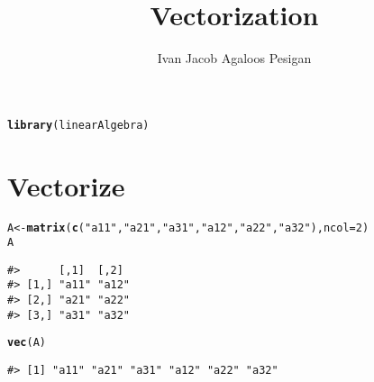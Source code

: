 \documentclass{article}\usepackage[]{graphicx}\usepackage[]{color}
\title{Vectorization}
\author{Ivan Jacob Agaloos Pesigan}
\date{}
\makeatletter
\newcommand{\hlnum}[1]{\textcolor[rgb]{0.686,0.059,0.569}{#1}}%
\newcommand{\hlstr}[1]{\textcolor[rgb]{0.192,0.494,0.8}{#1}}%
\newcommand{\hlstd}[1]{\textcolor[rgb]{0.345,0.345,0.345}{#1}}%
\newcommand{\hlkwb}[1]{\textcolor[rgb]{0.69,0.353,0.396}{#1}}%
\newcommand{\hlkwc}[1]{\textcolor[rgb]{0.333,0.667,0.333}{#1}}%
\newcommand{\hlkwd}[1]{\textcolor[rgb]{0.737,0.353,0.396}{\textbf{#1}}}%
\newenvironment{kframe}{%
 \def\at@end@of@kframe{}%
 \ifinner\ifhmode%
  \def\at@end@of@kframe{\end{minipage}}%
  \begin{minipage}{\columnwidth}%
 \fi\fi%
 \def\FrameCommand##1{\hskip\@totalleftmargin \hskip-\fboxsep
 \colorbox{shadecolor}{##1}\hskip-\fboxsep
     \hskip-\linewidth \hskip-\@totalleftmargin \hskip\columnwidth}%
 \MakeFramed {\advance\hsize-\width
   \@totalleftmargin\z@ \linewidth\hsize
   \@setminipage}}%
 {\par\unskip\endMakeFramed%
 \at@end@of@kframe}
\newenvironment{knitrout}{}{} %
\makeatother
\begin{document}
\maketitle





\begin{knitrout}
\color{fgcolor}\begin{kframe}
\begin{alltt}
\hlkwd{library}\hlstd{(linearAlgebra)}
\end{alltt}
\end{kframe}
\end{knitrout}

\section*{Vectorize}





\begin{knitrout}
\color{fgcolor}\begin{kframe}
\begin{alltt}
\hlstd{A} \hlkwb{<-} \hlkwd{matrix}\hlstd{(}\hlkwd{c}\hlstd{(}\hlstr{"a11"}\hlstd{,} \hlstr{"a21"}\hlstd{,} \hlstr{"a31"}\hlstd{,} \hlstr{"a12"}\hlstd{,} \hlstr{"a22"}\hlstd{,} \hlstr{"a32"}\hlstd{),} \hlkwc{ncol} \hlstd{=} \hlnum{2}\hlstd{)}
\hlstd{A}
\end{alltt}
\begin{verbatim}
#>      [,1]  [,2] 
#> [1,] "a11" "a12"
#> [2,] "a21" "a22"
#> [3,] "a31" "a32"
\end{verbatim}
\end{kframe}
\end{knitrout}

\begin{knitrout}
\color{fgcolor}\begin{kframe}
\begin{alltt}
\hlkwd{vec}\hlstd{(A)}
\end{alltt}
\begin{verbatim}
#> [1] "a11" "a21" "a31" "a12" "a22" "a32"
\end{verbatim}
\end{kframe}
\end{knitrout}
\end{document}
